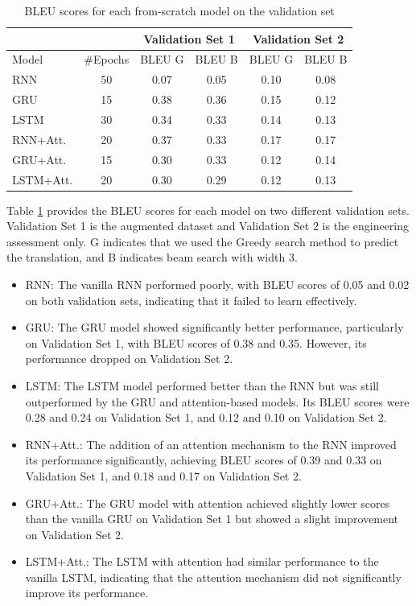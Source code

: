 \begin{table}[H]
	\centering
	\begin{tabular}{lccccc}
		\cmidrule(l){3-6}
		\multicolumn{2}{l}{} & \multicolumn{2}{c}{Validation Set 1} & \multicolumn{2}{c}{Validation Set 2} \\ \midrule
		Model     & \#Epochs & BLEU G          & BLEU B         & BLEU G          & BLEU B         \\ \midrule
		RNN       & 50       & 0.07            & 0.05           & 0.10            & 0.08           \\
		GRU       & 15       & 0.38            & 0.36           & 0.15            & 0.12           \\
		LSTM      & 30       & 0.34            & 0.33           & 0.14            & 0.13           \\
		RNN+Att.  & 20       & 0.37            & 0.33           & 0.17            & 0.17           \\
		GRU+Att.  & 15       & 0.30            & 0.33           & 0.12            & 0.14           \\
		LSTM+Att. & 20       & 0.30            & 0.29           & 0.12            & 0.13           \\ \bottomrule
	\end{tabular}
	\caption{BLEU scores for each from-scratch model on the validation set}
	\label{tab:tab1}
\end{table}

Table \ref{tab:tab1} provides the BLEU scores for each model on two different validation sets. Validation Set 1 is the augmented dataset and Validation Set 2 is the engineering assessment only. G indicates that we used the Greedy search method to predict the translation, and B indicates beam search with width 3.

\begin{itemize}
	\item RNN: The vanilla RNN performed poorly, with BLEU scores of 0.05 and 0.02 on both validation sets, indicating that it failed to learn effectively.
	\item GRU: The GRU model showed significantly better performance, particularly on Validation Set 1, with BLEU scores of 0.38 and 0.35. However, its performance dropped on Validation Set 2.
	\item LSTM: The LSTM model performed better than the RNN but was still outperformed by the GRU and attention-based models. Its BLEU scores were 0.28 and 0.24 on Validation Set 1, and 0.12 and 0.10 on Validation Set 2.
	\item RNN+Att.: The addition of an attention mechanism to the RNN improved its performance significantly, achieving BLEU scores of 0.39 and 0.33 on Validation Set 1, and 0.18 and 0.17 on Validation Set 2.
	\item GRU+Att.: The GRU model with attention achieved slightly lower scores than the vanilla GRU on Validation Set 1 but showed a slight improvement on Validation Set 2.
	\item LSTM+Att.: The LSTM with attention had similar performance to the vanilla LSTM, indicating that the attention mechanism did not significantly improve its performance.
\end{itemize}


